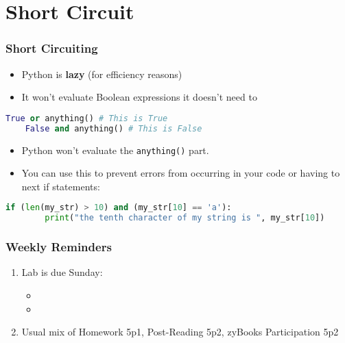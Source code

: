 \documentclass{beamer}
\begin{document}
%
%
\section{Short Circuit}
\begin{frame}[fragile]
	\frametitle{Short Circuiting}
	\begin{itemize}
		\item Python is \textbf{lazy} (for efficiency reasons)
		\item It won't evaluate Boolean expressions it doesn't need to
	\end{itemize}
	\vfill
	\begin{lstlisting}[language=Python, autogobble]
	True or anything() # This is True 
	False and anything() # This is False
	\end{lstlisting}
	\vfill
	\begin{itemize}
		\item Python won't evaluate the \lstinline|anything()| part.
		\item You can use this to prevent errors from occurring in your code or having to next if statements:
	\end{itemize}
	\vfill
	\begin{lstlisting}[language=Python, autogobble]
	if (len(my_str) > 10) and (my_str[10] == 'a'):
		print("the tenth character of my string is ", my_str[10])
	\end{lstlisting}
	\vfill
\end{frame}

%
%
\begin{frame}
	\frametitle{Weekly Reminders}
	\begin{enumerate}[A]
		\item Lab is due Sunday:
      \begin{itemize}
        \item 
        \item
      \end{itemize}
    \item Usual mix of Homework 5p1, Post-Reading 5p2, zyBooks Participation 5p2
	\end{enumerate}
\end{frame}
\end{document}
